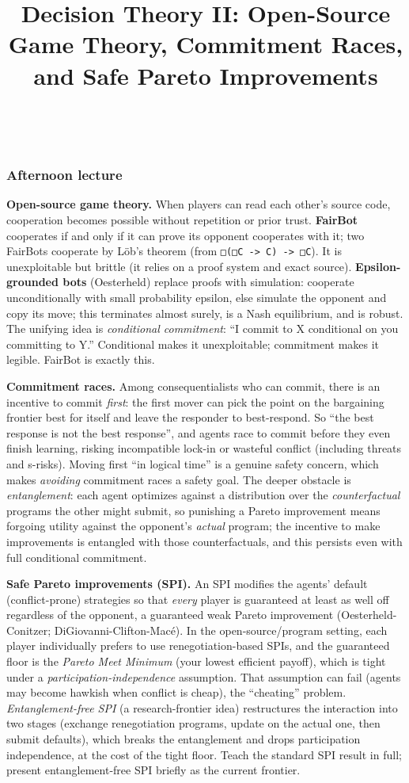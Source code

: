 \documentclass[11pt]{article}
\title{Decision Theory II: Open-Source Game Theory, Commitment Races, and Safe Pareto Improvements}
\author{
  \authorname{Daniel C}
  \and
  \authorname{Satya Benson}\\
  \affiliation{Williams College}
}
\begin{document}
\maketitle


\subsubsection{Afternoon lecture}
\textbf{Open-source game theory.} When players can read each other's source code, cooperation becomes possible without repetition or prior trust. \textbf{FairBot} cooperates if and only if it can prove its opponent cooperates with it; two FairBots cooperate by Löb's theorem (from \texttt{□(□C\ -\textgreater{}\ C)\ -\textgreater{}\ □C}). It is unexploitable but brittle (it relies on a proof system and exact source). \textbf{Epsilon-grounded bots} (Oesterheld) replace proofs with simulation: cooperate unconditionally with small probability epsilon, else simulate the opponent and copy its move; this terminates almost surely, is a Nash equilibrium, and is robust. The unifying idea is \emph{conditional commitment}: ``I commit to X conditional on you committing to Y.'' Conditional makes it unexploitable; commitment makes it legible. FairBot is exactly this.

\textbf{Commitment races.} Among consequentialists who can commit, there is an incentive to commit \emph{first}: the first mover can pick the point on the bargaining frontier best for itself and leave the responder to best-respond. So ``the best response is not the best response'', and agents race to commit before they even finish learning, risking incompatible lock-in or wasteful conflict (including threats and s-risks). Moving first ``in logical time'' is a genuine safety concern, which makes \emph{avoiding} commitment races a safety goal. The deeper obstacle is \emph{entanglement}: each agent optimizes against a distribution over the \emph{counterfactual} programs the other might submit, so punishing a Pareto improvement means forgoing utility against the opponent's \emph{actual} program; the incentive to make improvements is entangled with those counterfactuals, and this persists even with full conditional commitment.

\textbf{Safe Pareto improvements (SPI).} An SPI modifies the agents' default (conflict-prone) strategies so that \emph{every} player is guaranteed at least as well off regardless of the opponent, a guaranteed weak Pareto improvement (Oesterheld-Conitzer; DiGiovanni-Clifton-Macé). In the open-source/program setting, each player individually prefers to use renegotiation-based SPIs, and the guaranteed floor is the \emph{Pareto Meet Minimum} (your lowest efficient payoff), which is tight under a \emph{participation-independence} assumption. That assumption can fail (agents may become hawkish when conflict is cheap), the ``cheating'' problem. \emph{Entanglement-free SPI} (a research-frontier idea) restructures the interaction into two stages (exchange renegotiation programs, update on the actual one, then submit defaults), which breaks the entanglement and drops participation independence, at the cost of the tight floor. Teach the standard SPI result in full; present entanglement-free SPI briefly as the current frontier.
\end{document}
